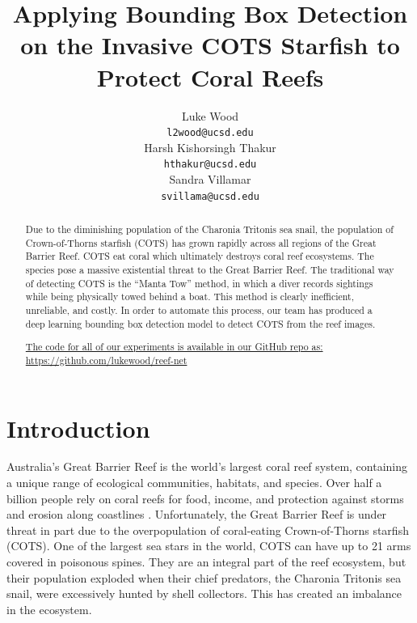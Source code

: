 \documentclass{article}
\title{Applying Bounding Box Detection on the Invasive COTS Starfish to Protect Coral Reefs}
\author{
    Luke Wood \\
    \texttt{l2wood@ucsd.edu} \\
    \And 
    Harsh Kishorsingh Thakur \\
    \texttt{hthakur@ucsd.edu} \\
    \And 
    Sandra Villamar \\
  \texttt{svillama@ucsd.edu} \\
}
\begin{document}
\maketitle

\begin{abstract}
Due to the diminishing population of the Charonia Tritonis sea snail, the population of Crown-of-Thorns starfish (COTS) has grown rapidly across all regions of the Great Barrier Reef. COTS eat coral which ultimately destroys coral reef ecosystems. The species pose a massive existential threat to the Great Barrier Reef. The traditional way of detecting COTS is the “Manta Tow” method, in which a diver records sightings while being physically towed behind a boat. This method is clearly inefficient, unreliable, and costly. In order to automate this process, our team has produced a deep learning bounding box detection model to detect COTS from the reef images.

\hyperlink{https://github.com/lukewood/reef-net}{The code for all of our experiments is available in our GitHub repo as: https://github.com/lukewood/reef-net}
\end{abstract}

\section{Introduction}
Australia’s Great Barrier Reef is the world’s largest coral reef system, containing a unique range of ecological communities, habitats, and species. Over half a billion people rely on coral reefs for food, income, and protection against storms and erosion along coastlines \cite{coralreefecosystems}. Unfortunately, the Great Barrier Reef is under threat in part due to the overpopulation of coral-eating Crown-of-Thorns starfish (COTS). One of the largest sea stars in the world, COTS can have up to 21 arms covered in poisonous spines. They are an integral part of the reef ecosystem, but their population exploded when their chief predators, the Charonia Tritonis sea snail, were excessively hunted by shell collectors. This has created an imbalance in the ecosystem.
\end{document}
